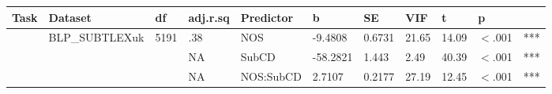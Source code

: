 \begin{table}[ht]
\centering
\begingroup\normalsize
\begin{tabular}{lllllllllll}
  \hline
Task & Dataset & df & adj.r.sq & Predictor & b & SE & VIF & t & p &  \\ 
  \hline
 & BLP\_SUBTLEXuk & 5191 & .38 & NOS & -9.4808 & 0.6731 & 21.65 & 14.09 & $<$.001 & *** \\ 
   &  &  & NA & SubCD & -58.2821 & 1.443 & 2.49 & 40.39 & $<$.001 & *** \\ 
   &  &  & NA & NOS:SubCD & 2.7107 & 0.2177 & 27.19 & 12.45 & $<$.001 & *** \\ 
   \hline
\end{tabular}
\endgroup
\end{table}
